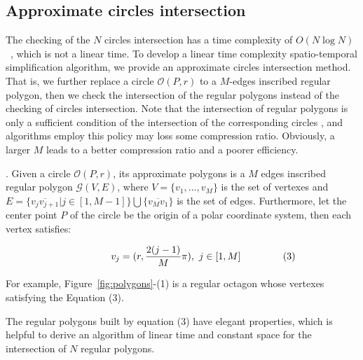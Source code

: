 \subsection{Approximate circles intersection}

The checking of the $N$ circles intersection has a time complexity of \textcolor[rgb]{1.00,0.00,0.00}{${O(N\log N)}$~\cite{Shamos:Circle}}, which is not a linear time.
To develop a linear time complexity spatio-temporal simplification algorithm, we provide an approximate circles intersection method.
That is, we further replace a circle $\mathcal{O}(P, r)$ to a $M$-edges inscribed regular polygon,
then we check the intersection of the regular polygons instead of the checking of circles intersection.
Note that the intersection of regular polygons is only a sufficient condition of the intersection of the corresponding circles , and
algorithms employ this policy may loss some compression ratio. Obviously, a larger $M$ leads to a better compression ratio and a poorer
efficiency.

.
Given a circle $\mathcal{O}(P, r)$, its approximate polygons is a $M$ edges inscribed regular polygon $\mathcal{G}(V, E)$,
where $V=\{v_1, \ldots, v_{M}\}$ is the set of vertexes and
$E= \{\overline{v_jv_{j+1}}| j\in [1,M-1]\} \bigcup \{\overline{v_Mv_1}\}$ is the set of edges.
Furthermore, let the center point $P$ of the circle be the origin of a polar coordinate system, then each vertex satisfies:

\vspace{-2ex}
\begin{equation*}
\label{equ-regular-polygon}
    \begin{aligned}
        \hspace{10ex}  v_j = (r, \frac{2(j-1)}{M}\pi), ~j \in [1, M]    \hspace{10ex} (3)\\
    \end{aligned}
\end{equation*}
\vspace{-1ex}


For example, Figure~\ref{fig:polygons}-(1) is a regular octagon whose vertexes satisfying the Equation (3).

The regular polygons built by equation (3) have elegant properties, which is helpful to derive an algorithm of linear time and constant space
for the intersection of $N$ regular polygons.



